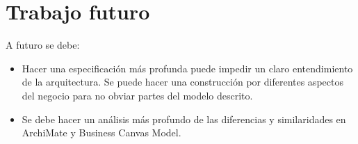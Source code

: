 
\chapter{Trabajo futuro}

A futuro se debe: 

\begin{itemize}
    \item Hacer una especificación más profunda puede impedir un claro entendimiento de la arquitectura. Se puede hacer una construcción por diferentes aspectos del negocio para no obviar partes del modelo descrito.
    
    \item Se debe hacer un análisis más profundo de las diferencias y similaridades en ArchiMate y Business Canvas Model. 

    
\end{itemize}